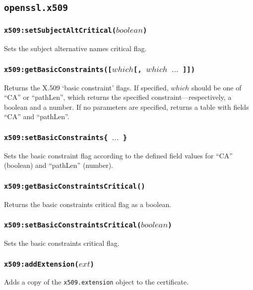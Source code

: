 \documentclass[11pt, oneside]{memoir}
\newcommand*{\fn}[1]{\texttt{#1}\xspace}
\newcommand*{\module}[1]{\texttt{#1}\xspace}
\newcounter{toccols}
\newenvironment{Module}[1]{
	\subsection{\texttt{#1}}
	\addtocontents{toc}{
		\protect\begin{multicols}{\value{toccols}}
	}
}{
	\addtocontents{toc}{\protect\end{multicols}}
}
\begin{document}
\begin{Module}{openssl.x509}
\subsubsection[\fn{x509:setSubjectAltCritical}]{\fn{x509:setSubjectAltCritical($boolean$)}}

Sets the subject alternative names critical flag.

\subsubsection[\fn{x509:getBasicConstraints}]{\fn{x509:getBasicConstraints([$which$[, $which$ $\ldots$ ]])}}

Returns the X.509 `basic constraint' flags. If specified, $which$ should be one of ``CA'' or ``pathLen'', which returns the specified constraint---respectively, a boolean and a number.  If no parameters are specified, returns a table with fields ``CA'' and ``pathLen''.

\subsubsection[\fn{x509:setBasicConstraints}]{\fn{x509:setBasicConstraints\{ $\ldots$ \}}}

Sets the basic constraint flag according to the defined field values for ``CA'' (boolean) and ``pathLen'' (number).

\subsubsection[\fn{x509:getBasicConstraintsCritical}]{\fn{x509:getBasicConstraintsCritical()}}

Returns the basic constraints critical flag as a boolean.

\subsubsection[\fn{x509:setBasicConstraintsCritical}]{\fn{x509:setBasicConstraintsCritical($boolean$)}}

Sets the basic constraints critical flag.

\subsubsection[\fn{x509:addExtension}]{\fn{x509:addExtension($ext$)}}

Adds a copy of the \module{x509.extension} object to the certificate. 


\end{Module}
\end{document}
